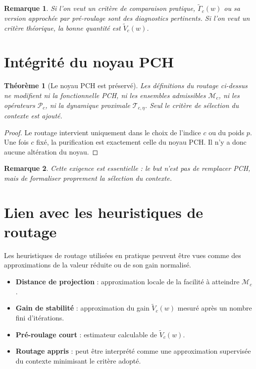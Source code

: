 \documentclass[11pt,a4paper]{article}
\newtheorem{theorem}{Théorème}[section]
\newtheorem{remark}{Remarque}[section]
\newcommand{\Mcal}{\mathcal M}
\newcommand{\Pcal}{\mathcal P}
\newcommand{\Tcal}{\mathcal T}
\begin{document}
\begin{remark}
Si l'on veut un critère de comparaison pratique, \(\widetilde \Gamma_c(w)\) ou sa version approchée par pré-roulage sont des diagnostics pertinents. Si l'on veut un critère théorique, la bonne quantité est \(\widetilde V_c(w)\).
\end{remark}

\section{Intégrité du noyau PCH}

\begin{theorem}[Le noyau PCH est préservé]
Les définitions du routage ci-dessus ne modifient ni la fonctionnelle PCH, ni les ensembles admissibles \(\Mcal_c\), ni les opérateurs \(\Pcal_c\), ni la dynamique proximale \(\Tcal_{c,\eta}\). Seul le critère de sélection du contexte est ajouté.
\end{theorem}

\begin{proof}
Le routage intervient uniquement dans le choix de l'indice \(c\) ou du poids \(p\). Une fois \(c\) fixé, la purification est exactement celle du noyau PCH. Il n'y a donc aucune altération du noyau.
\end{proof}

\begin{remark}
Cette exigence est essentielle : le but n'est pas de remplacer PCH, mais de formaliser proprement la sélection du contexte.
\end{remark}

\section{Lien avec les heuristiques de routage}

Les heuristiques de routage utilisées en pratique peuvent être vues comme des approximations de la valeur réduite ou de son gain normalisé.

\begin{itemize}[leftmargin=2em]
\item \textbf{Distance de projection} : approximation locale de la facilité à atteindre \(\Mcal_c\).
\item \textbf{Gain de stabilité} : approximation du gain \(\widetilde V_c(w)\) mesuré après un nombre fini d'itérations.
\item \textbf{Pré-roulage court} : estimateur calculable de \(\widetilde V_c(w)\).
\item \textbf{Routage appris} : peut être interprété comme une approximation supervisée du contexte minimisant le critère adopté.
\end{itemize}
\end{document}
